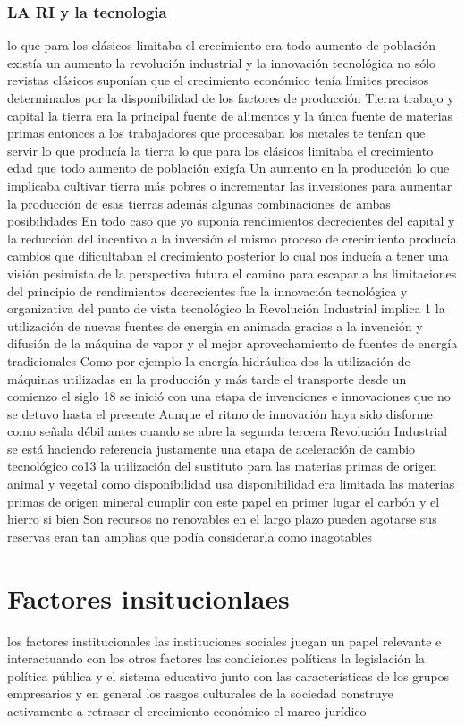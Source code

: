 \documentclass[12pt]{book}++
\begin{document}
\subsubsection{LA RI y la tecnologia}
lo que para los clásicos limitaba el crecimiento era todo aumento de población existía un aumento la revolución industrial y la innovación tecnológica no sólo revistas clásicos suponían que el crecimiento económico tenía límites precisos determinados por la disponibilidad de los factores de producción Tierra trabajo y capital la tierra era la principal fuente de alimentos y la única fuente de materias primas entonces a los trabajadores que procesaban los metales te tenían que servir lo que producía la tierra lo que para los clásicos limitaba el crecimiento edad que todo aumento de población exigía Un aumento en la producción lo que implicaba cultivar tierra más pobres o incrementar las inversiones para aumentar la producción de esas tierras además algunas combinaciones de ambas posibilidades En todo caso que yo suponía rendimientos decrecientes del capital y la reducción del incentivo a la inversión el mismo proceso de crecimiento producía cambios que dificultaban el crecimiento posterior lo cual nos inducía a tener una visión pesimista de la perspectiva futura el camino para escapar a las limitaciones del principio de rendimientos decrecientes fue la innovación tecnológica y organizativa del punto de vista tecnológico la Revolución Industrial implica 1 la utilización de nuevas fuentes de energía en animada gracias a la invención y difusión de la máquina de vapor y el mejor aprovechamiento de fuentes de energía tradicionales Como por ejemplo la energía hidráulica dos la utilización de máquinas utilizadas en la producción y más tarde el transporte desde un comienzo el siglo 18 se inició con una etapa de invenciones e innovaciones que no se detuvo hasta el presente Aunque el ritmo de innovación haya sido disforme como señala débil antes cuando se abre la segunda tercera Revolución Industrial se está haciendo referencia justamente una etapa de aceleración de cambio tecnológico co13 la utilización del sustituto para las materias primas de origen animal y vegetal como disponibilidad usa disponibilidad era limitada las materias primas de origen mineral cumplir con este papel en primer lugar el carbón y el hierro si bien Son recursos no renovables en el largo plazo pueden agotarse sus reservas eran tan amplias que podía considerarla como inagotables
\section{Factores insitucionlaes}
los factores institucionales las instituciones sociales juegan un papel relevante e interactuando con los otros factores las condiciones políticas la legislación la política pública y el sistema educativo junto con las características de los grupos empresarios y en general los rasgos culturales de la sociedad construye activamente a retrasar el crecimiento económico el marco jurídico
\end{document}
